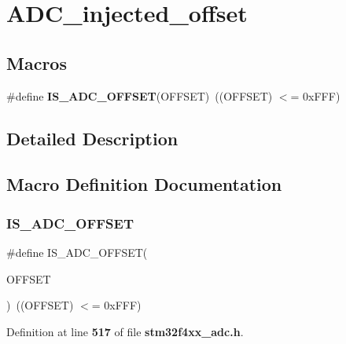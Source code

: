 \section{A\+D\+C\+\_\+injected\+\_\+offset}
\label{group__ADC__injected__offset}
\subsection*{Macros}
\begin{DoxyCompactItemize}
\item 
\#define \textbf{ I\+S\+\_\+\+A\+D\+C\+\_\+\+O\+F\+F\+S\+ET}(O\+F\+F\+S\+ET)~((O\+F\+F\+S\+ET) $<$= 0x\+F\+F\+F)
\end{DoxyCompactItemize}


\subsection{Detailed Description}


\subsection{Macro Definition Documentation}
\mbox{\label{group__ADC__injected__offset_ga252eaf5d2552f0d11b1bcca7dc48950a}} 
\subsubsection{I\+S\+\_\+\+A\+D\+C\+\_\+\+O\+F\+F\+S\+ET}
{\footnotesize\ttfamily \#define I\+S\+\_\+\+A\+D\+C\+\_\+\+O\+F\+F\+S\+ET(\begin{DoxyParamCaption}\item[{}]{O\+F\+F\+S\+ET }\end{DoxyParamCaption})~((O\+F\+F\+S\+ET) $<$= 0x\+F\+F\+F)}



Definition at line \textbf{ 517} of file \textbf{ stm32f4xx\+\_\+adc.\+h}.

